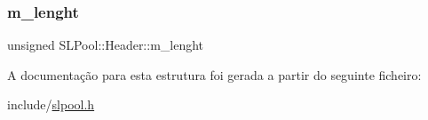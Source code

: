 \subsubsection{\texorpdfstring{m\+\_\+lenght}{m\_lenght}}
{\footnotesize\ttfamily unsigned S\+L\+Pool\+::\+Header\+::m\+\_\+lenght}



A documentação para esta estrutura foi gerada a partir do seguinte ficheiro\+:\begin{DoxyCompactItemize}
\item 
include/\hyperlink{slpool_8h}{slpool.\+h}\end{DoxyCompactItemize}
